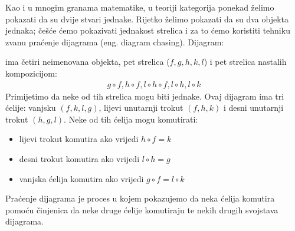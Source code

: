   Kao i u mnogim granama matematike, u teoriji kategorija ponekad želimo
  pokazati da su dvije stvari jednake. Rijetko želimo pokazati da su dva
  objekta jednaka; češće ćemo pokazivati jednakost strelica i za to ćemo
  koristiti tehniku zvanu praćenje dijagrama (eng. diagram chasing).
  Dijagram:

  \begin{center}
  \end{center}
  ima četiri neimenovana objekta, pet strelica ($f, g, h, k, l$) i pet
  strelica nastalih kompozicijom:
  \begin{align*}
    g \circ f, h \circ f, l \circ h \circ f, l \circ h, l \circ k
  \end{align*}
  Primijetimo da neke od tih strelica mogu biti jednake.
  Ovaj dijagram ima tri ćelije: vanjsku $(f, k, l, g)$, lijevi
  unutarnji trokut $(f, h, k)$ i desni unutarnji trokut $(h, g, l)$.
  Neke od tih ćelija mogu komutirati:
  \begin{itemize}
      \item lijevi trokut komutira ako vrijedi $h \circ f = k$
      \item desni trokut komutira ako vrijedi $l \circ h = g$
      \item vanjska ćelija komutira ako vrijedi $g \circ f = l \circ k$
  \end{itemize}
  Praćenje dijagrama je proces u kojem pokazujemo da neka ćelija komutira pomoću
  činjenica da neke druge ćelije komutiraju te nekih drugih svojstava dijagrama.\\

